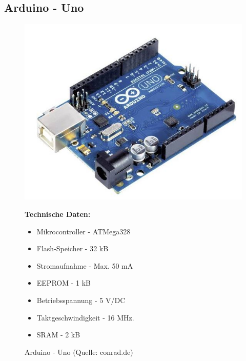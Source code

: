 \subsection{Arduino - Uno}
\begin{figure}[htb]
	\centering
	\begin{minipage}{0.49\linewidth}
		\centering
		\includegraphics[scale=0.5]{images/uno.jpg}
		\caption{Arduino - Uno   \newline (Quelle: conrad.de)}
	\end{minipage}
	\begin{minipage}{0.45\linewidth}
		\textbf{Technische Daten:} 
		\begin{itemize} 
			\item Mikrocontroller - ATMega328
			\item Flash-Speicher - 32 kB
			\item Stromaufnahme - Max. 50 mA
			\item EEPROM - 1 kB
			\item Betriebsspannung - 5 V/DC
			\item Taktgeschwindigkeit - 16 MHz.
			\item SRAM - 2 kB
		\end{itemize}
	\end{minipage}
\end{figure}
\pagebreak

 

